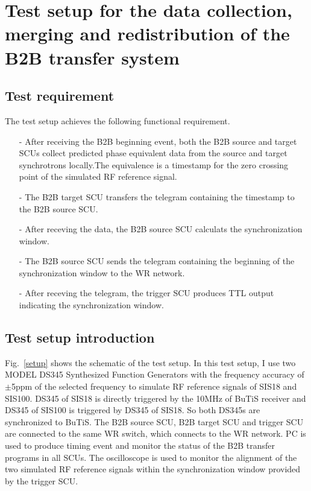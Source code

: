 \section{Test setup for the data collection, merging and redistribution of the B2B transfer system}

\subsection{Test requirement}
The test setup achieves the following functional requirement.
\begin{itemize}
\item[-] After receiving the B2B beginning event, both the B2B source and target SCUs collect predicted phase equivalent data from the source and target synchrotrons locally.The equivalence is a timestamp for the zero crossing point of the simulated RF reference signal. 
\item[-] The B2B target SCU transfers the telegram containing the timestamp to the B2B source SCU.
\item[-] After receving the data, the B2B source SCU calculats the synchronization window.
\item[-] The B2B source SCU sends the telegram containing the beginning of the synchronization window to the WR network.
\item[-] After receving the telegram, the trigger SCU produces TTL output indicating the synchronization window. 
\end{itemize}

\subsection{Test setup introduction}
Fig.~\ref{setup} shows the schematic of the test setup. In this test setup, I use two MODEL DS345 Synthesized Function Generators with the frequency accuracy of $\pm$5ppm of the selected frequency to simulate RF reference signals of SIS18 and SIS100. DS345 of SIS18 is directly triggered by the 10MHz of BuTiS receiver and DS345 of SIS100 is triggered by DS345 of SIS18. So both DS345s are synchronized to BuTiS. The B2B source SCU, B2B target SCU and trigger SCU are connected to the same WR switch, which connects to the WR network. PC is used to produce timing event and monitor the status of the B2B transfer programs in all SCUs. The oscilloscope is used to monitor the alignment of the two simulated RF reference signals within the synchronization window provided by the trigger SCU.   

